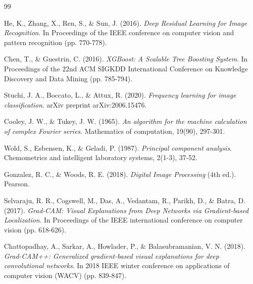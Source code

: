 \begin{thebibliography}{99}


He, K., Zhang, X., Ren, S., \& Sun, J. (2016). 
\textit{Deep Residual Learning for Image Recognition}. 
In Proceedings of the IEEE conference on computer vision and pattern recognition (pp. 770-778).

Chen, T., \& Guestrin, C. (2016). 
\textit{XGBoost: A Scalable Tree Boosting System}. 
In Proceedings of the 22nd ACM SIGKDD International Conference on Knowledge Discovery and Data Mining (pp. 785-794).

Stuchi, J. A., Boccato, L., \& Attux, R. (2020). 
\textit{Frequency learning for image classification}. 
arXiv preprint arXiv:2006.15476.


Cooley, J. W., \& Tukey, J. W. (1965). 
\textit{An algorithm for the machine calculation of complex Fourier series}. 
Mathematics of computation, 19(90), 297-301.

Wold, S., Esbensen, K., \& Geladi, P. (1987). 
\textit{Principal component analysis}. 
Chemometrics and intelligent laboratory systems, 2(1-3), 37-52.

Gonzalez, R. C., \& Woods, R. E. (2018). 
\textit{Digital Image Processing} (4th ed.). 
Pearson.


Selvaraju, R. R., Cogswell, M., Das, A., Vedantam, R., Parikh, D., \& Batra, D. (2017). 
\textit{Grad-CAM: Visual Explanations from Deep Networks via Gradient-based Localization}. 
In Proceedings of the IEEE international conference on computer vision (pp. 618-626).

Chattopadhay, A., Sarkar, A., Howlader, P., \& Balasubramanian, V. N. (2018). 
\textit{Grad-CAM++: Generalized gradient-based visual explanations for deep convolutional networks}. 
In 2018 IEEE winter conference on applications of computer vision (WACV) (pp. 839-847).


\end{thebibliography}
